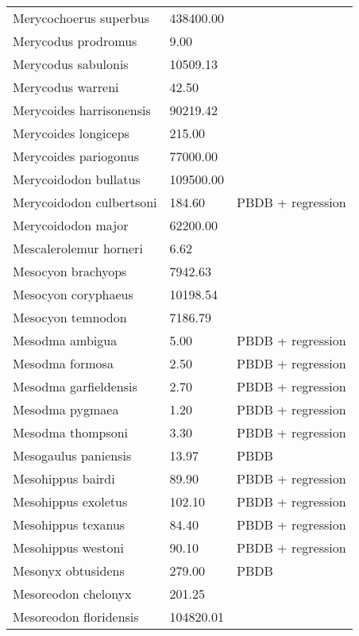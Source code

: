\documentclass{article}
\begin{document}
\begin{center}
\begin{longtable}{p{} p{} p{}}
    Merycochoerus superbus & 438400.00 & \cite{McKenna2011} \\ 
    Merycodus prodromus & 9.00 & \cite{Kelley1954} \\ 
    Merycodus sabulonis & 10509.13 & \cite{Tomiya2013} \\ 
    Merycodus warreni & 42.50 & \cite{Baskin2004} \\ 
    Merycoides harrisonensis & 90219.42 & \cite{Tomiya2013} \\ 
    Merycoides longiceps & 215.00 & \cite{Stock1948} \\ 
    Merycoides pariogonus & 77000.00 & \cite{McKenna2011} \\ 
    Merycoidodon bullatus & 109500.00 & \cite{McKenna2011} \\ 
    Merycoidodon culbertsoni & 184.60 & PBDB + regression \\ 
    Merycoidodon major & 62200.00 & \cite{McKenna2011} \\ 
    Mescalerolemur horneri & 6.62 & \cite{MacIntyre1966} \\ 
    Mesocyon brachyops & 7942.63 & \cite{Tomiya2013} \\ 
    Mesocyon coryphaeus & 10198.54 & \cite{Tomiya2013} \\ 
    Mesocyon temnodon & 7186.79 & \cite{Tomiya2013} \\ 
    Mesodma ambigua & 5.00 & PBDB + regression \\ 
    Mesodma formosa & 2.50 & PBDB + regression \\ 
    Mesodma garfieldensis & 2.70 & PBDB + regression \\ 
    Mesodma pygmaea & 1.20 & PBDB + regression \\ 
    Mesodma thompsoni & 3.30 & PBDB + regression \\ 
    Mesogaulus paniensis & 13.97 & PBDB \\ 
    Mesohippus bairdi & 89.90 & PBDB + regression \\ 
    Mesohippus exoletus & 102.10 & PBDB + regression \\ 
    Mesohippus texanus & 84.40 & PBDB + regression \\ 
    Mesohippus westoni & 90.10 & PBDB + regression \\ 
    Mesonyx obtusidens & 279.00 & PBDB \\ 
    Mesoreodon chelonyx & 201.25 & \cite{Bever2003} \\ 
    Mesoreodon floridensis & 104820.01 & \cite{Tomiya2013} \\ 

\end{longtable}
\end{center}
\end{document}
